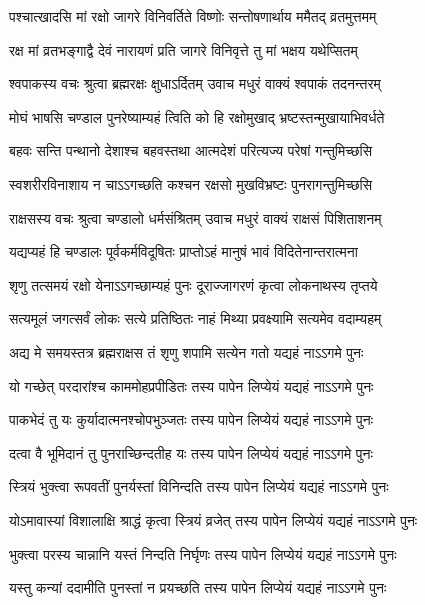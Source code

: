 \twolineshloka
{पश्चात्खादसि मां रक्षो जागरे विनिवर्तिते}
{विष्णोः सन्तोषणार्थाय ममैतद् व्रतमुत्तमम्}%

\twolineshloka
{रक्ष मां व्रतभङ्गाद्वै देवं नारायणं प्रति}
{जागरे विनिवृत्ते तु मां भक्षय यथेप्सितम्}%

\twolineshloka
{श्वपाकस्य वचः श्रुत्वा ब्रह्मरक्षः क्षुधाऽर्दितम्}
{उवाच मधुरं वाक्यं श्वपाकं तदनन्तरम्}%

\twolineshloka
{मोघं भाषसि चण्डाल पुनरेष्याम्यहं त्विति}
{को हि रक्षोमुखाद् भ्रष्टस्तन्मुखायाभिवर्धते}%

\twolineshloka
{बहवः सन्ति पन्थानो देशाश्च बहवस्तथा}
{आत्मदेशं परित्यज्य परेषां गन्तुमिच्छसि}%

\twolineshloka
{स्वशरीरविनाशाय न चाऽऽगच्छति कश्चन}
{रक्षसो मुखविभ्रष्टः पुनरागन्तुमिच्छसि}%

\twolineshloka
{राक्षसस्य वचः श्रुत्वा चण्डालो धर्मसंश्रितम्}
{उवाच मधुरं वाक्यं राक्षसं पिशिताशनम्}%

\twolineshloka
{यद्यप्यहं हि चण्डालः पूर्वकर्मविदूषितः}
{प्राप्तोऽहं मानुषं भावं विदितेनान्तरात्मना}%

\twolineshloka
{शृणु तत्समयं रक्षो येनाऽऽगच्छाम्यहं पुनः}
{दूराज्जागरणं कृत्वा लोकनाथस्य तृप्तये}%

\twolineshloka
{सत्यमूलं जगत्सर्वं लोकः सत्ये प्रतिष्ठितः}
{नाहं मिथ्या प्रवक्ष्यामि सत्यमेव वदाम्यहम्}%

\twolineshloka
{अद्य मे समयस्तत्र ब्रह्मराक्षस तं शृणु}
{शपामि सत्येन गतो यद्यहं नाऽऽगमे पुनः}%

\twolineshloka
{यो गच्छेत् परदारांश्च काममोहप्रपीडितः}
{तस्य पापेन लिप्येयं यद्यहं नाऽऽगमे पुनः}%

\twolineshloka
{पाकभेदं तु यः कुर्यादात्मनश्चोपभुञ्जतः}
{तस्य पापेन लिप्येयं यद्यहं नाऽऽगमे पुनः}%

\twolineshloka
{दत्वा वै भूमिदानं तु पुनराच्छिन्दतीह यः}
{तस्य पापेन लिप्येयं यद्यहं नाऽऽगमे पुनः}%

\twolineshloka
{स्त्रियं भुक्त्वा रूपवतीं पुनर्यस्तां विनिन्दति}
{तस्य पापेन लिप्येयं यद्यहं नाऽऽगमे पुनः}%

\twolineshloka
{योऽमावास्यां विशालाक्षि श्राद्धं कृत्वा स्त्रियं व्रजेत्}
{तस्य पापेन लिप्येयं यद्यहं नाऽऽगमे पुनः}%

\twolineshloka
{भुक्त्वा परस्य चान्नानि यस्तं निन्दति निर्घृणः}
{तस्य पापेन लिप्येयं यद्यहं नाऽऽगमे पुनः}%

\twolineshloka
{यस्तु कन्यां ददामीति पुनस्तां न प्रयच्छति}
{तस्य पापेन लिप्येयं यद्यहं नाऽऽगमे पुनः}%

